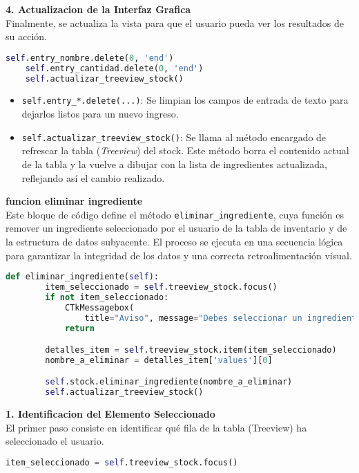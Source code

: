 \documentclass[a4paper,12pt]{article}
\begin{document}
\textbf{4. Actualizacion de la Interfaz Grafica}\\
Finalmente, se actualiza la vista para que el usuario pueda ver los resultados de su acción.

\begin{lstlisting}[language=Python, caption={desenglosando codigo}, frame=single]
    self.entry_nombre.delete(0, 'end')
    self.entry_cantidad.delete(0, 'end')
    self.actualizar_treeview_stock()
\end{lstlisting}

\begin{itemize} 
\item \verb|self.entry_*.delete(...)|: Se limpian los campos de entrada de texto para dejarlos listos para un nuevo ingreso. 
\item \verb|self.actualizar_treeview_stock()|: Se llama al método encargado de refrescar la tabla (\textit{Treeview}) del stock. Este método borra el contenido actual de la tabla y la vuelve a dibujar con la lista de ingredientes actualizada, reflejando así el cambio realizado. 
\end{itemize}

\textbf{funcion eliminar ingrediente}\\
Este bloque de código define el método \verb|eliminar_ingrediente|, cuya función es remover un ingrediente seleccionado por el usuario de la tabla de inventario y de la estructura de datos subyacente. El proceso se ejecuta en una secuencia lógica para garantizar la integridad de los datos y una correcta retroalimentación visual.
\begin{lstlisting}[language=Python, caption={implementacion de codigo}, frame=single]
def eliminar_ingrediente(self):
        item_seleccionado = self.treeview_stock.focus()
        if not item_seleccionado:
            CTkMessagebox(
                title="Aviso", message="Debes seleccionar un ingrediente de la tabla.", icon="warning")
            return

        detalles_item = self.treeview_stock.item(item_seleccionado)
        nombre_a_eliminar = detalles_item['values'][0]

        self.stock.eliminar_ingrediente(nombre_a_eliminar)
        self.actualizar_treeview_stock()
\end{lstlisting}

\newpage
\textbf{1. Identificacion del Elemento Seleccionado}\\
El primer paso consiste en identificar qué fila de la tabla (Treeview) ha seleccionado el usuario.
\begin{lstlisting}[language=Python, caption={desenglosando codigo}, frame=single]
    item_seleccionado = self.treeview_stock.focus()
\end{lstlisting}
\end{document}
